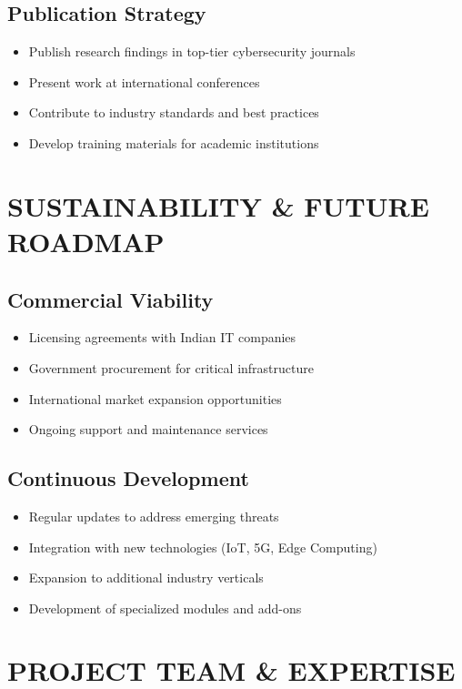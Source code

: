 \documentclass[12pt,a4paper]{article}
\begin{document}
\subsection{Publication Strategy}
\begin{itemize}
\item Publish research findings in top-tier cybersecurity journals
\item Present work at international conferences
\item Contribute to industry standards and best practices
\item Develop training materials for academic institutions
\end{itemize}

\section{SUSTAINABILITY \& FUTURE ROADMAP}

\subsection{Commercial Viability}
\begin{itemize}
\item Licensing agreements with Indian IT companies
\item Government procurement for critical infrastructure
\item International market expansion opportunities
\item Ongoing support and maintenance services
\end{itemize}

\subsection{Continuous Development}
\begin{itemize}
\item Regular updates to address emerging threats
\item Integration with new technologies (IoT, 5G, Edge Computing)
\item Expansion to additional industry verticals
\item Development of specialized modules and add-ons
\end{itemize}

\section{PROJECT TEAM \& EXPERTISE}
\end{document}

